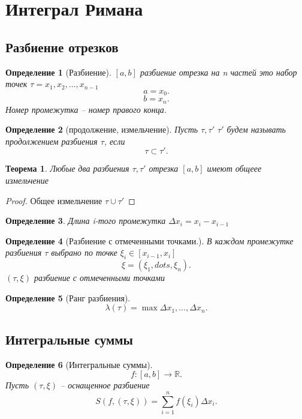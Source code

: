 \documentclass{scrartcl}
\newtheorem{theorem}{Теорема}
\newtheorem{definition}{Определение}
\begin{document}
\section{Интеграл Римана}
\subsection{Разбиение отрезков}
\begin{definition}[Разбиение]
    $[a,b]$ разбиение отрезка на n частей это набор точек  $\tau = x_1,x_2,\dots,x_{n - 1}$
    \[
    a = x_{0}
    .\] 
    \[
    b =  x_{n}
    .\] 
    Номер промежутка -- номер правого конца.
\end{definition}
\begin{definition}[продолжение, измельчение]
Пусть $\tau,\tau'$ $\tau'$ будем называть продолжением разбиения  $\tau$, если 
\[
\tau \subset \tau'
.\] 
\end{definition}
\begin{theorem}
    Любые два разбиения $\tau, \tau'$ отрезка $[a,b]$ имеют общеее измельчение
\end{theorem}
\begin{proof}
    Общее измельчение $\tau \cup \tau'$
\end{proof}
\begin{definition}
    Длина i-того промежутка $\Delta x_{i} = x_{i} - x_{i - 1}$
\end{definition}
\begin{definition}[Разбиение с отмеченными точками.]
    В каждом промежутке разбиения $\tau$ выбрано по точке  $\xi_{i} \in [x_{i - 1},x_{{i}}]$ 
    \[
    \xi = (\xi_1,dots,\xi_{n})
    .\] 
    $(\tau,\xi)$ разбиение с отмеченными точками
\end{definition}
\begin{definition}[Ранг разбиения]
    \[
        \lambda(\tau) = \max{\Delta x_1,\dots, \Delta x_{n}}
    .\] 
\end{definition}
\subsection{Интегральные суммы}
\begin{definition}[Интегральные суммы]
    \[
        f : [a,b] \to \mathbb{R}
    .\] 
    Пусть $(\tau,\xi)$ -- оснащенное разбиение
    \[
    S(f,( \tau,\xi )) = \sum_{i = 1}^{n} f(\xi_{i}) \Delta x_{i}
    .\] 
\end{definition}
\end{document}

